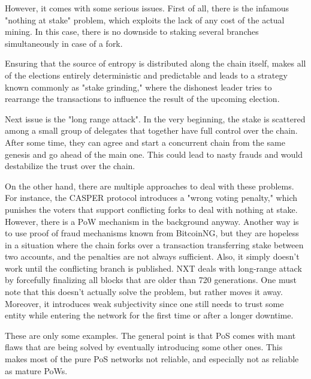 However, it comes with some serious issues. First of all, there is the infamous "nothing at stake"
\cite{pos_flaws_nothing}
problem, which exploits the lack of any cost of the actual mining. In this case,
there is no downside to staking several branches simultaneously in case of a fork.

Ensuring that the source of entropy is distributed along the chain itself,
makes all of the elections entirely deterministic and predictable and leads to a strategy
known commonly as "stake grinding," where the dishonest leader tries to rearrange the
transactions to influence the result of the upcoming election.

Next issue is the "long range attack"\cite{pos_flaws_long}.
In the very beginning, the stake is scattered among a small
group of delegates that together have full control over the chain. After
some time, they can agree and start a concurrent chain from the same genesis
and go ahead of the main one. This could lead to nasty frauds and would
destabilize the trust over the chain.

On the other hand, there are multiple approaches to deal with these problems. For instance,
the CASPER protocol introduces a "wrong voting penalty," which punishes the
voters that support conflicting forks to deal with nothing at stake\cite{casper}.
However, there is a PoW mechanism in the background anyway. Another way is to use
proof of fraud mechanisms known from BitcoinNG\cite{bcng},
but they are hopeless in a situation where the chain forks over a transaction
transferring stake between two accounts, and the penalties are not always
sufficient. Also, it simply doesn't work until the
conflicting branch is published. NXT deals with long-range attack by forcefully
finalizing all blocks that are older than 720 generations\cite{nxt}.
One must note that this doesn't actually solve the problem, but rather moves it
away. Moreover, it introduces weak subjectivity since one still needs to trust
some entity while entering the network for the first time or after a longer downtime.

These are only some examples. The general point is that PoS comes with mant flaws
that are being solved by eventually introducing some other ones. This
makes most of the pure PoS networks not reliable, and especially not as reliable
as mature PoWs.
